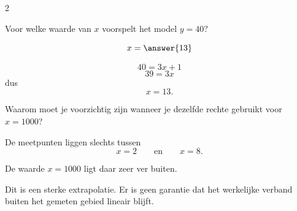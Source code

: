 \documentclass{ximera}
\begin{document}
\begin{oefening}{\oefU\ESS}
\begin{multicols}{2}
\begin{question}
Voor welke waarde van $x$ voorspelt het model $y=40$?

\[
x=\answer{13}
\]

\begin{oplossing}
\[
40=3x+1
\]
\[
39=3x
\]
dus
\[
x=13.
\]
\end{oplossing}
\end{question}


\begin{question}
Waarom moet je voorzichtig zijn wanneer je dezelfde rechte gebruikt voor $x=1000$?

\begin{oplossing}
De meetpunten liggen slechts tussen
\[
x=2
\qquad\text{en}\qquad
x=8.
\]

De waarde $x=1000$ ligt daar zeer ver buiten.

Dit is een sterke extrapolatie. Er is geen garantie dat het werkelijke verband buiten het gemeten gebied lineair blijft.
\end{oplossing}
\end{question}

\end{multicols}

\end{oefening}



\end{document}

